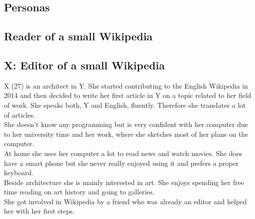 \documentclass[11pt]{article}
\begin{document}
\subsection{Personas}

\subsection{Reader of a small Wikipedia}

\subsection{X: Editor of a small Wikipedia}
X (27) is an architect in Y. She started contributing to the English Wikipedia in 2014 and then decided to write her first article in Y on a topic related to her field of work. She speaks both, Y and English, fluently. Therefore she translates a lot of articles. \\
She doesn't know any programming but is very confident with her computer due to her university time and her work, where she sketches most of her plans on the computer. \\
At home she uses her computer a lot to read news and watch movies. She does have a smart phone but she never really enjoyed using it and prefers a proper keyboard. \\  
Beside architecture she is mainly interested in art. She enjoys spending her free time reading on art history and going to galleries. \\
She got involved in Wikipedia by a friend who was already an editor and helped her with her first steps.
\end{document}
